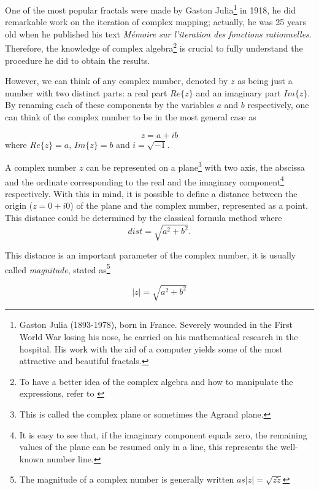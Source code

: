 \documentclass{article}
\begin{document}
One of the most popular fractals were made by Gaston Julia\footnote{Gaston Julia (1893-1978), born in France. Severely wounded in the First World War losing his nose, he carried on his mathematical research in the hospital. His work with the aid of a computer yields some of the most attractive and beautiful fractals.} in 1918, he did remarkable work on the iteration of complex mapping; actually, he was 25 years old when he published his text \textit{Mémoire  sur  l’iteration  des  fonctions  rationnelles}\cite{PJS}. Therefore, the knowledge of complex algebra\footnote{ To have a better idea of the complex algebra and how to manipulate the expressions, refer to \cite{wolfram}} is crucial to fully understand the procedure he did to obtain the results.

However, we can think of any complex number, denoted by $z$ as being just a number with two distinct parts: a real part $Re\{z\}$ and an imaginary part $Im\{z\}$. By renaming each of these components by the variables $a$ and $b$ respectively, one can think of the complex number to be in the most general case as

\begin{equation}
    z=a+ib
\end{equation} where $Re\{z\} = a$, $Im\{z\} = b$ and $i=\sqrt{-1}$.

 A complex number $z$ can be represented on a plane\footnote{This is called the complex plane or sometimes the Agrand plane.} with two axis, the abscissa and the ordinate corresponding to the real and the imaginary component\footnote{It is easy to see that, if the imaginary component equals zero, the remaining values of the plane can be resumed only in a line, this represents the well-known number line.} respectively. With this in mind, it is possible to define a distance between the origin ($z=0+i0$) of the plane and the complex number, represented as a point. This distance could be determined by the classical formula method where
\begin{equation}
    dist = \sqrt{a^2 + b^2}.
\end{equation}

This distance is an important parameter of the complex number, it is usually called \textit{magnitude}, stated as\footnote{The magnitude of a complex number is generally written $as |z| =\sqrt{z\tilde{z}} $} 

\begin{equation}
    |z| = \sqrt{a^2 + b^2}
\end{equation}
\end{document}
